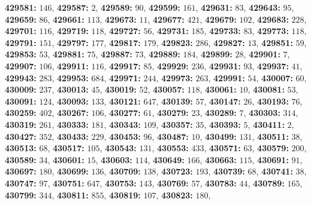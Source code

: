 \textsf{\bfseries 429581:} $146$, \textsf{\bfseries 429587:} $2$, \textsf{\bfseries 429589:} $90$, \textsf{\bfseries 429599:} $161$, \textsf{\bfseries 429631:} $83$, \textsf{\bfseries 429643:} $95$, \textsf{\bfseries 429659:} $86$, \textsf{\bfseries 429661:} $113$, \textsf{\bfseries 429673:} $11$, \textsf{\bfseries 429677:} $421$, \textsf{\bfseries 429679:} $102$, \textsf{\bfseries 429683:} $228$, \textsf{\bfseries 429701:} $116$, \textsf{\bfseries 429719:} $118$, \textsf{\bfseries 429727:} $56$, \textsf{\bfseries 429731:} $185$, \textsf{\bfseries 429733:} $83$, \textsf{\bfseries 429773:} $118$, \textsf{\bfseries 429791:} $151$, \textsf{\bfseries 429797:} $177$, \textsf{\bfseries 429817:} $179$, \textsf{\bfseries 429823:} $286$, \textsf{\bfseries 429827:} $13$, \textsf{\bfseries 429851:} $59$, \textsf{\bfseries 429853:} $53$, \textsf{\bfseries 429881:} $75$, \textsf{\bfseries 429887:} $73$, \textsf{\bfseries 429889:} $184$, \textsf{\bfseries 429899:} $28$, \textsf{\bfseries 429901:} $7$, \textsf{\bfseries 429907:} $106$, \textsf{\bfseries 429911:} $116$, \textsf{\bfseries 429917:} $85$, \textsf{\bfseries 429929:} $236$, \textsf{\bfseries 429931:} $93$, \textsf{\bfseries 429937:} $41$, \textsf{\bfseries 429943:} $283$, \textsf{\bfseries 429953:} $684$, \textsf{\bfseries 429971:} $244$, \textsf{\bfseries 429973:} $263$, \textsf{\bfseries 429991:} $54$, \textsf{\bfseries 430007:} $60$, \textsf{\bfseries 430009:} $237$, \textsf{\bfseries 430013:} $45$, \textsf{\bfseries 430019:} $52$, \textsf{\bfseries 430057:} $118$, \textsf{\bfseries 430061:} $10$, \textsf{\bfseries 430081:} $53$, \textsf{\bfseries 430091:} $124$, \textsf{\bfseries 430093:} $133$, \textsf{\bfseries 430121:} $647$, \textsf{\bfseries 430139:} $57$, \textsf{\bfseries 430147:} $26$, \textsf{\bfseries 430193:} $76$, \textsf{\bfseries 430259:} $402$, \textsf{\bfseries 430267:} $106$, \textsf{\bfseries 430277:} $61$, \textsf{\bfseries 430279:} $23$, \textsf{\bfseries 430289:} $7$, \textsf{\bfseries 430303:} $314$, \textsf{\bfseries 430319:} $261$, \textsf{\bfseries 430333:} $181$, \textsf{\bfseries 430343:} $109$, \textsf{\bfseries 430357:} $35$, \textsf{\bfseries 430393:} $5$, \textsf{\bfseries 430411:} $2$, \textsf{\bfseries 430427:} $352$, \textsf{\bfseries 430433:} $229$, \textsf{\bfseries 430453:} $96$, \textsf{\bfseries 430487:} $10$, \textsf{\bfseries 430499:} $131$, \textsf{\bfseries 430511:} $38$, \textsf{\bfseries 430513:} $68$, \textsf{\bfseries 430517:} $105$, \textsf{\bfseries 430543:} $131$, \textsf{\bfseries 430553:} $433$, \textsf{\bfseries 430571:} $63$, \textsf{\bfseries 430579:} $200$, \textsf{\bfseries 430589:} $34$, \textsf{\bfseries 430601:} $15$, \textsf{\bfseries 430603:} $114$, \textsf{\bfseries 430649:} $166$, \textsf{\bfseries 430663:} $115$, \textsf{\bfseries 430691:} $91$, \textsf{\bfseries 430697:} $180$, \textsf{\bfseries 430699:} $136$, \textsf{\bfseries 430709:} $138$, \textsf{\bfseries 430723:} $193$, \textsf{\bfseries 430739:} $68$, \textsf{\bfseries 430741:} $38$, \textsf{\bfseries 430747:} $97$, \textsf{\bfseries 430751:} $647$, \textsf{\bfseries 430753:} $143$, \textsf{\bfseries 430769:} $57$, \textsf{\bfseries 430783:} $44$, \textsf{\bfseries 430789:} $165$, \textsf{\bfseries 430799:} $344$, \textsf{\bfseries 430811:} $855$, \textsf{\bfseries 430819:} $107$, \textsf{\bfseries 430823:} $180$, 
